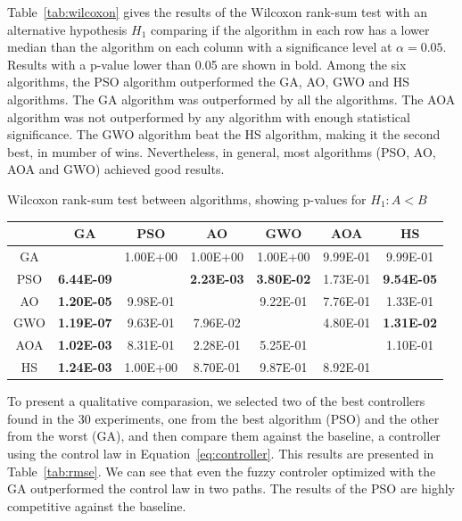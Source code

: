 \documentclass[symmetry,article,submit,moreauthors,pdftex]{Definitions/mdpi}
\begin{document}
Table~\ref{tab:wilcoxon} gives the results of the Wilcoxon rank-sum test with
an alternative hypothesis $H_1$ comparing if the algorithm in each row has a
lower median than the algorithm on each column with a significance level at
$\alpha = 0.05$. Results with a p-value lower than 0.05 are shown in bold.
Among the six algorithms, the PSO algorithm outperformed the GA, AO, GWO and HS
algorithms. The GA algorithm was outperformed by all the algorithms. The AOA
algorithm was not outperformed by any algorithm with enough statistical
significance. The GWO algorithm beat the HS algorithm, making it the second
best, in mumber of wins.  Nevertheless, in general, most algorithms (PSO, AO,
AOA and GWO) achieved good results.

\begin{specialtable}[H] 
\small
\centering
\caption{Wilcoxon rank-sum test between algorithms, showing p-values for $H_1:A<B$}\label{tab:wilcoxon} 
\begin{tabular}{ccccccc}
\toprule 
    & GA       & PSO      & AO       & GWO      & AOA      & HS       \\
\midrule
GA  &          & 1.00E+00 & 1.00E+00 & 1.00E+00 & 9.99E-01 & 9.99E-01 \\
\midrule
PSO & \textbf{6.44E-09} &          & \textbf{2.23E-03} & \textbf{3.80E-02} & 1.73E-01 & \textbf{9.54E-05} \\
\midrule
AO  & \textbf{1.20E-05} & 9.98E-01 &          & 9.22E-01 & 7.76E-01 & 1.33E-01 \\
\midrule
GWO & \textbf{1.19E-07} & 9.63E-01 & 7.96E-02 &          & 4.80E-01 & \textbf{1.31E-02} \\
\midrule
AOA & \textbf{1.02E-03} & 8.31E-01 & 2.28E-01 & 5.25E-01 &          & 1.10E-01 \\
\midrule
HS  & \textbf{1.24E-03} & 1.00E+00 & 8.70E-01 & 9.87E-01 & 8.92E-01 &          \\
\bottomrule
\end{tabular}
\end{specialtable}

To present a qualitative comparasion, we selected two of the best controllers
found in the 30 experiments,  one from the best algorithm (PSO) and the other
from the worst (GA), and then compare them against the baseline, a controller
using the control law in Equation~\ref{eq:controller}. This results are
presented in Table~\ref{tab:rmse}. We can see that even the fuzzy controler
optimized with the GA outperformed the control law in two paths. The results 
of the PSO are highly competitive against the baseline.
\end{document}
